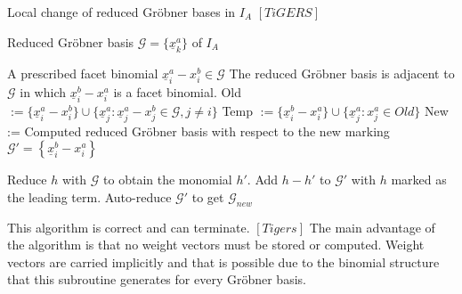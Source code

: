 \begin{algorithm}
\caption{Local change of reduced Gröbner bases in $I_A$ $\left[ TiGERS\right]  $}
\label{alg:flip}
\begin{algorithmic}[1]

\Require
Reduced Gröbner basis $ \mathcal{G} = \lbrace \underline{x}^{a}_{k}  \rbrace $ of $I_A$

A prescribed facet binomial $ \underline{x}^{a}_{i} - x^{b}_{i} \in \mathcal{G} $
\Ensure The reduced Gröbner basis is adjacent to $\mathcal{G}$ in which $ \underline{x}^{b}_{i} - x^{a}_{i} $ is a facet binomial.
\State Old 
$:= \lbrace \underline{x}^{a}_{i} - x^{b}_{i} \rbrace \cup
 \lbrace \underline{x}^{a}_{j} : \underline{x}^{a}_{j} - x^{b}_{j} \in \mathcal{G},
 j \neq i \rbrace $ 
 \State Temp $:= \lbrace \underline{x}^{b}_{i} - x^{a}_{i} \rbrace \cup 
 \lbrace \underline{x}^{a}_{j} : x^{a}_{j} \in Old  \rbrace $
 \State New := Computed reduced Gröbner basis with respect to the new marking 
 \State $\mathcal{G}' = \left\lbrace \underline{x}^{b}_{i} - x^{a}_{i} \right\rbrace  $
 
 \State Reduce $h$ with $\mathcal{G}$ to obtain the monomial $h'$.
 \State Add $h-h'$ to $\mathcal{G}'$ with $h$ marked as the leading term.
 \EndFor
 \State Auto-reduce $\mathcal{G}'$ to get $\mathcal{G}_{new}$

\end{algorithmic}
\end{algorithm}

This algorithm is correct and can terminate. $ \left[ Tigers \right] $
The main advantage of the algorithm is that no weight vectors must be stored or computed.
Weight vectors are carried implicitly and that is possible due to the binomial structure that this subroutine generates for every Gröbner basis.

